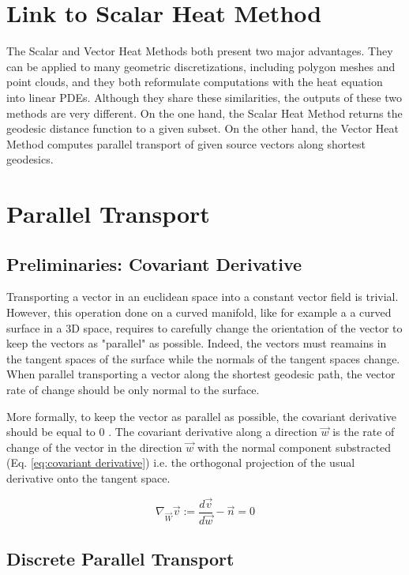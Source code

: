 \documentclass[sigconf, nonacm]{acmart}
\begin{document}
\section{Link to Scalar Heat Method}
The Scalar and Vector Heat Methods both present two major advantages. 
They can be applied to many geometric discretizations, including polygon meshes and point clouds, and they both reformulate computations with the heat equation into linear PDEs. Although they share these similarities, the outputs of these two methods are very different. On the one hand, the Scalar Heat Method returns the geodesic distance function to a given subset. On the other hand, the Vector Heat Method computes parallel transport of given source vectors along shortest geodesics. 

\section{Parallel Transport}

\subsection{Preliminaries: Covariant Derivative}
Transporting a vector in an euclidean space into a constant vector field is trivial. However, this operation done on a curved manifold, like for example a a curved surface in a 3D space, requires to carefully change the orientation of the vector to keep the vectors as "parallel" as possible. Indeed, the vectors must reamains in the tangent spaces of the surface while the normals of the tangent spaces change. When parallel transporting a vector along the shortest geodesic path, the vector rate of change should be only normal to the surface. 

More formally, to keep the vector as parallel as possible, the covariant derivative should be equal to 0 \cite{youtube_video}. The covariant derivative along a direction $\vec{w} $ is the rate of change of the vector in the direction $\vec{w}$ with the normal component substracted (Eq. \ref{eq:covariant derivative}) i.e. the orthogonal projection of the usual derivative onto the tangent space.

\begin{equation}
  \nabla_{\vec{W}}\vec{v}:=\frac{d\vec{v}}{d\vec{w}}-\vec{n}=0
  \label{eq:covariant derivative}
\end{equation}

\subsection{Discrete Parallel Transport}
\end{document}
